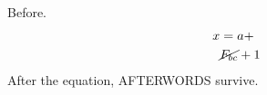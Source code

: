 \documentclass{article}
\begin{document}
Before.
\begin{equation}
\begin{aligned}
x &= a + \\
  & \cancel{F_{bc}} + 1
\end{aligned}
\end{equation}
After the equation, AFTERWORDS survive.
\end{document}
